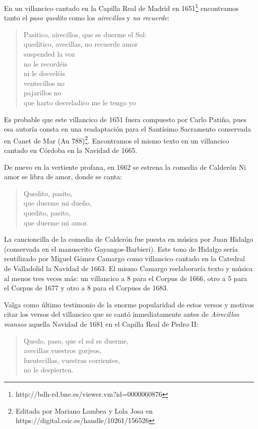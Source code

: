 En un villancico cantado en la Capilla Real de Madrid en 1651\footnote{http://bdh-rd.bne.es/viewer.vm?id=0000060876} encontramos tanto el \textit{paso quedito} como los \textit{airecillos} y \textit{no recuerde}: 

\begingroup
\centering
\itshape
\begin{verse}
Pasitico, airecillos, que se duerme el Sol:\\
queditico, avecillas, no recuerde amor\\
suspended la voz\\
no le recordéis\\
ni le desveléis\\
ventecillos no\\
pajarillos no\\
que harto desveladico me le tengo yo\\
\end{verse}
\endgroup

Es probable que este villancico de 1651 fuera compuesto por Carlo Patiño, pues esa autoría consta en una readaptación para el Santísimo Sacramento conservada en Canet de Mar (Au 788)\footnote{Editada por Mariano Lambea y Lola Josa en https://digital.csic.es/handle/10261/156526}. Encontramos el mismo texto en un villancico cantado en Córdoba en la Navidad de 1665. 

De nuevo en la vertiente profana, en 1662 se estrena la comedia de Calderón Ni amor se libra de amor, donde se canta:

\begingroup
\centering
\itshape
\begin{verse}
Quedito, pasito,\\
que duerme mi dueño,\\
quedito, pasito,\\
que duerme mi amor.\\
\end{verse}
\endgroup

La cancioncilla de la comedia de Calderón fue puesta en música por Juan Hidalgo (conservada en el manuscrito Gayangos-Barbieri). Este tono de Hidalgo sería reutilizado por Miguel Gómez Camargo como villancico cantado en la Catedral de Valladolid la Navidad de 1663. El mismo Camargo reelaboraría texto y música al menos tres veces más: un villancico a 8 para el Corpus de 1666, otro a 5 para el Corpus de 1677 y otro a 8 para el Corpues de 1683.

Valga como último testimonio de la enorme popularidad de estos versos y motivos citar los versos del villancico que se cantó inmediatamente antes de \textit{Airecillos mansos} aquella Navidad de 1681 en el Capilla Real de Pedro II:

\begingroup
\centering
\itshape
\begin{verse}
Quedo, paso,
que el sol se duerme,\\
avecillas vuestros gorjeos,\\
fuentecillas, vuestras corrientes,\\
no le despierten.\\
\end{verse}
\endgroup
